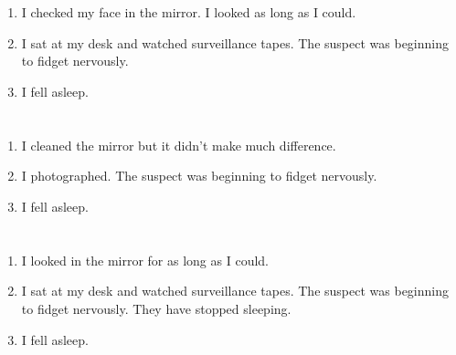 \documentclass{article}
\begin{document}
    \section{}
    
    \begin{enumerate}
    
    \item I checked my face in the mirror. I looked as long as I could.\\
    
    \item I sat at my desk and watched surveillance tapes. The suspect was beginning to fidget nervously.\\
    
    \item I fell asleep.\\
    
    \end{enumerate}
     
    \newpage
    
    \section{}
    
    \begin{enumerate}
    
    \item I cleaned the mirror but it didn't make much difference.\\
    
    \item I photographed. The suspect was beginning to fidget nervously.\\
    
    \item I fell asleep.\\
    
    \end{enumerate}
     
    \newpage
    
    \section{}
    
    \begin{enumerate}
    
    \item I looked in the mirror for as long as I could.\\
    
    \item I sat at my desk and watched surveillance tapes. The suspect was beginning to fidget nervously. They have stopped sleeping.\\
    
    \item I fell asleep.\\
    
    \end{enumerate}
     
\end{document}
